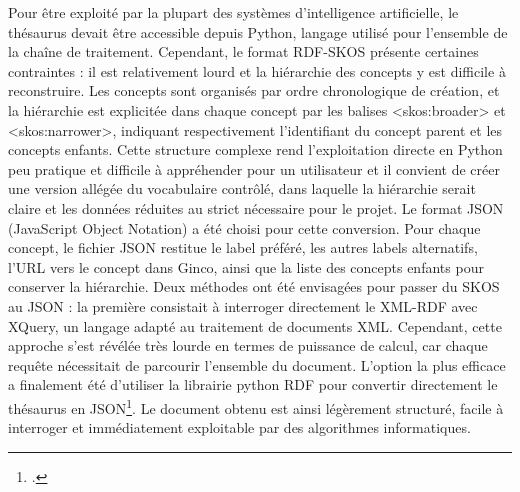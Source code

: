 Pour être exploité par la plupart des systèmes d’intelligence artificielle, le thésaurus devait être accessible depuis Python, langage utilisé pour l’ensemble de la chaîne de traitement. Cependant, le format RDF-SKOS présente certaines contraintes : il est relativement lourd et la hiérarchie des concepts y est difficile à reconstruire. Les concepts sont organisés par ordre chronologique de création, et la hiérarchie est explicitée dans chaque concept par les balises <skos:broader> et <skos:narrower>, indiquant respectivement l’identifiant du concept parent et les concepts enfants. Cette structure complexe rend l’exploitation directe en Python peu pratique et difficile à appréhender pour un utilisateur et il convient de créer une version allégée du vocabulaire contrôlé, dans laquelle la hiérarchie serait claire et les données réduites au strict nécessaire pour le projet. Le format JSON (JavaScript Object Notation) a été choisi pour cette conversion. Pour chaque concept, le fichier JSON restitue le label préféré, les autres labels alternatifs, l’URL vers le concept dans Ginco, ainsi que la liste des concepts enfants pour conserver la hiérarchie. Deux méthodes ont été envisagées pour passer du SKOS au JSON : la première consistait à interroger directement le XML-RDF avec XQuery, un langage adapté au traitement de documents XML. Cependant, cette approche s’est révélée très lourde en termes de puissance de calcul, car chaque requête nécessitait de parcourir l’ensemble du document. L’option la plus efficace a finalement été d’utiliser la librairie python RDF pour convertir directement le thésaurus en JSON\footcite{DocumentationLibrairiePython}. Le document obtenu est ainsi légèrement structuré, facile à interroger et immédiatement exploitable par des algorithmes informatiques.

